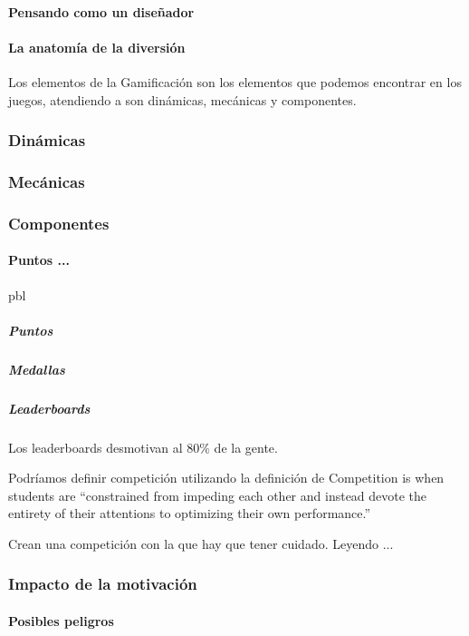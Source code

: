 \documentclass[a4paper, 12pt]{book}
\begin{document}
\paragraph{Pensando como un diseñador}
\paragraph{La anatomía de la diversión}

Los elementos de la Gamificación son los elementos que podemos encontrar en los juegos, atendiendo a \cite{Hunicke04mda:a} son dinámicas, mecánicas y componentes.


\subsubsection{Dinámicas}

\subsubsection{Mecánicas}

\subsubsection{Componentes}



\paragraph{Puntos ...} \gls{pbl}

\subparagraph*{Puntos}

\subparagraph*{Medallas}

\subparagraph*{Leaderboards}

Los leaderboards desmotivan al 80\% de la gente. 

Podríamos definir competición utilizando la definición de \cite{Crawford_CompetitionDef} Competition is when students are “constrained from impeding each other and instead devote the entirety of their attentions to optimizing their own performance.”

Crean una competición con la que hay que tener cuidado. Leyendo \cite{CompetitionInEd}...

\subsubsection{Impacto de la motivación}

\paragraph{Posibles peligros}
\end{document}
